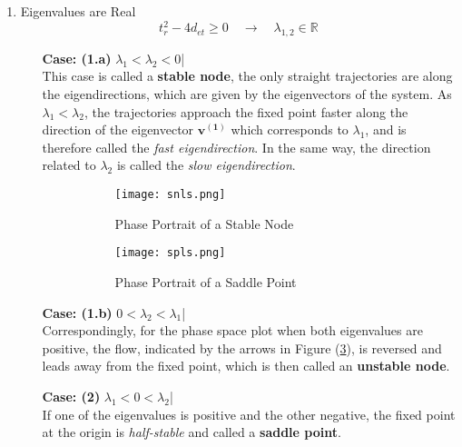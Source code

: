 \begin{enumerate}[label=\textbf{(\Alph*)}]
	\item Eigenvalues are Real
		\begin{equation}
			t_r^2-4d_{et}\geq0 \quad\rightarrow\quad \lambda_{1,2}\in\mathbb{R}
		\end{equation}
		\begin{enumerate}
			\item[\textbf{Case: (1.a)}]  $\lambda_1<\lambda_2<0$\quad|\quad\fbox{
	  			\mbox{$t_r^2-4d_{et}>0\quad d_{et}>0\quad t_r<0$}}\\
				This case is called a {\textbf{stable node}}, the only straight trajectories are along the eigendirections, which are given by the eigenvectors of the system.
				As $\lambda_1<\lambda_2$, the trajectories approach the fixed point faster along the direction of the eigenvector $\mathbf{v^{(1)}}$ which corresponds to $\lambda_1$, and is therefore called the \emph{fast eigendirection}.
				In the same way, the direction related to $\lambda_2$ is called the \emph{slow eigendirection}.
				\begin{figure}[h!]
					\centering
					\begin{subfigure}{0.4\linewidth}
						\texttt{[image: snls.png]}
						\caption{Phase Portrait of a Stable Node}
						\label{fig:snls}
					\end{subfigure}
					\vline
					\begin{subfigure}{0.364\linewidth}
						\texttt{[image: spls.png]}
						\caption{Phase Portrait of a Saddle Point}
						\label{fig:spls}
					\end{subfigure}
					\caption{}
					\label{fig:cls1}
		    	\end{figure}
		    \item[\textbf{Case: (1.b)}] $0<\lambda_2<\lambda_1$\quad|\quad {}\\
		    	Correspondingly, for the phase space plot when both eigenvalues are positive, the flow, indicated by the arrows in Figure (\ref{fig:cls1}), is reversed and leads away from the fixed point, which is then called an {\textbf{unstable node}}.	    
		    \item[\textbf{Case: (2)}] $\lambda_1<0<\lambda_2$\quad|\quad {}\\
		    	If one of the eigenvalues is positive and the other negative, the fixed point at the origin is \emph{half-stable} and called a {\textbf{saddle point}}.

\end{enumerate}
\end{enumerate}
